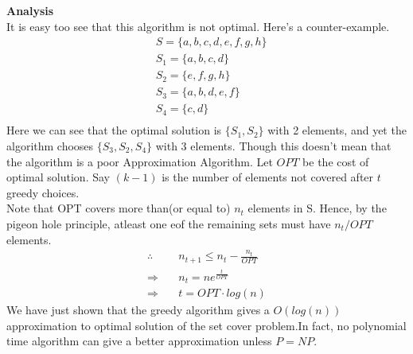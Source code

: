 \documentclass[12pt]{report}
\begin{document}
\textbf{Analysis}\\
It is easy too see that this algorithm is not optimal. Here's a counter-example. 
\begin{align*}
& S = \{a, b, c, d, e, f, g, h\} \\
& S_1 = \{a, b, c, d\}  \\
& S_2 = \{e, f, g, h\}     \\
& S_3 = \{a, b, d, e, f\}  \\
& S_4 = \{c, d\}  \\  
\end{align*}
Here we can see that the optimal solution is $\{S_1, S_2\}$ with 2 elements, and yet the algorithm chooses $\{S_3, S_2, S_4\}$ with 3 elements. Though this doesn't mean that the algorithm is a poor Approximation Algorithm.
Let $OPT$ be the cost of optimal solution. Say $(k-1)$ is the number of elements not covered after $t$ greedy choices. \\
Note that OPT covers more than(or equal to) $n_t$ elements in S. Hence, by the pigeon hole principle, atleast one eof the remaining sets must have $n_t/OPT$ elements.
\begin{align*}
\therefore \quad &n_{t+1} \leq n_t - \frac{n_t}{OPT} \\
\Rightarrow \quad &n_t = ne^{\frac{t}{OPT}} \\
\Rightarrow \quad &t = OPT \cdot log(n)
\end{align*}
We have just shown that the greedy algorithm gives a $O(log(n))$ approximation to optimal solution of the set cover problem.In fact, no polynomial time algorithm can give a better approximation unless $P = NP$.
\pagebreak
\end{document}
